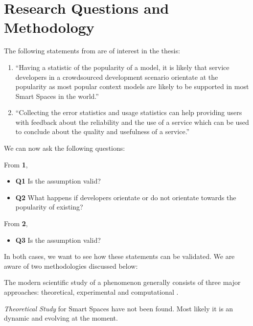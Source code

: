 \section{Research Questions and Methodology}
\label{sec:research_questions_and_methodology}

The following statements from \cite{pahl2014distributed} are of interest in the thesis:

\begin{enumerate}
  \item ``Having a statistic of the popularity of a model, it is likely that service developers in a crowdsourced development scenario orientate at the popularity as most popular context models are likely to be supported in most Smart Spaces in the world.''
  \item ``Collecting the error statistics and usage statistics can help providing users with feedback about the reliability and the use of a service which can be used to conclude about the quality and usefulness of a service.''
\end{enumerate}

We can now ask the following questions:

From \textbf{1}, 
\begin{itemize}
  \item[] \textbf{Q1} Is the assumption valid?
  \item[] \textbf{Q2} What happens if developers orientate or do not orientate towards the popularity of existing?
\end{itemize}

From \textbf{2},
\begin{itemize}
  \item[] \textbf{Q3} Is the assumption valid?
\end{itemize}

In both cases, we want to see how these statements can be validated. We are aware of two methodologies discussed below:

The modern scientific study of a phenomenon generally consists of three major approaches: theoretical, experimental and computational \cite{castiglione2006agent}.

\emph{Theoretical Study} for Smart Spaces have not been found. Most likely it is an dynamic and evolving at the moment.

